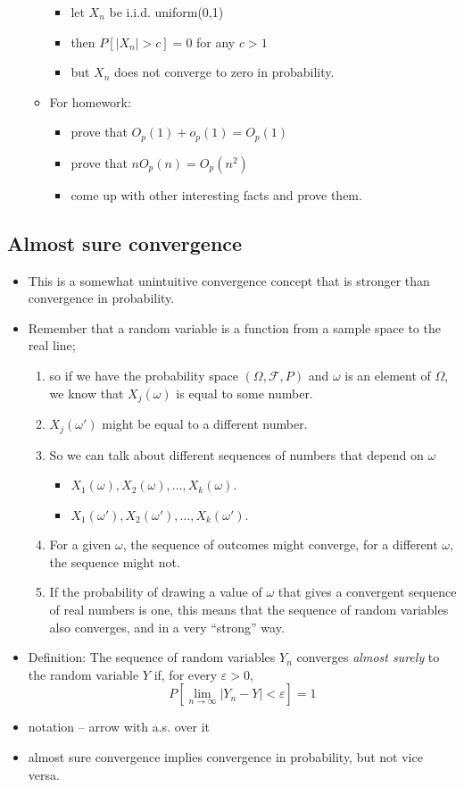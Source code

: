 \documentclass[11pt]{article}
\begin{document}
\begin{itemize}
\begin{itemize}
\begin{itemize}
\item let $X_n$ be i.i.d. uniform(0,1)
\item then $P[|X_n| > c]  = 0$ for any $c > 1$
\item but $X_n$ does not converge to zero in probability.
\end{itemize}
\item For homework:
\begin{itemize}
\item prove that $O_p(1) + o_p(1) = O_p(1)$
\item prove that $n O_p(n) = O_p(n^2)$
\item come up with other interesting facts and prove them.
\end{itemize}
\end{itemize}
\end{itemize}
\subsection{Almost sure convergence}
\label{sec-1-5}

\begin{itemize}
\item This is a somewhat unintuitive convergence concept that is stronger
        than convergence in probability.
\item Remember that a random variable is a function from a sample space
        to the real line;
\begin{enumerate}
\item so if we have the probability space $(\Omega,
           \mathcal F, P)$ and $\omega$ is an element of $\Omega$, we know
           that $X_j(\omega)$ is equal to some number.
\item $X_j(\omega')$ might be equal to a different number.
\item So we can talk about different sequences of numbers that
           depend on $\omega$
\begin{itemize}
\item $X_1(\omega), X_2(\omega), \dots, X_k(\omega)$.
\item $X_1(\omega'), X_2(\omega'), \dots, X_k(\omega')$.
\end{itemize}
\item For a given $\omega$, the sequence of outcomes might
           converge, for a different $\omega$, the sequence might not.
\item If the probability of drawing a value of $\omega$ that gives a
           convergent sequence of real numbers is one, this means that
           the sequence of random variables also converges, and in a very
           ``strong'' way.
\end{enumerate}
\item Definition: The sequence of random variables $Y_n$ converges
        \emph{almost surely} to the random variable $Y$ if, for every
        $\varepsilon > 0$, \[ P[\lim_{n \to \infty} | Y_n - Y | <
        \varepsilon] = 1 \]
\item notation -- arrow with a.s. over it
\item almost sure convergence implies convergence in probability, but
        not vice versa.
\end{itemize}
\end{document}

